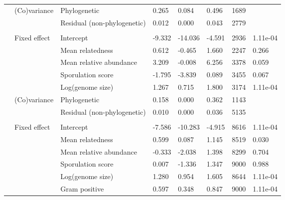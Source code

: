 \begin{table}
\begin{tabular}[t]{llllllll}
\hspace{1em} & (Co)variance & Phylogenetic & 0.265 & 0.084 & 0.496 & 1689 & \\
\hspace{1em} &  & Residual (non-phylogenetic) & 0.012 & 0.000 & 0.043 & 2779 & \\
\addlinespace[0.3em]
\multicolumn{8}{l}{\textbf{Antibiotic degradation}}\\
\hspace{1em} & Fixed effect & Intercept & -9.332 & -14.036 & -4.591 & 2936 & 1.11e-04\\
\hspace{1em} &  & Mean relatedness & 0.612 & -0.465 & 1.660 & 2247 & 0.266\\
\hspace{1em} &  & Mean relative abundance & 3.209 & -0.008 & 6.256 & 3378 & 0.059\\
\hspace{1em} &  & Sporulation score & -1.795 & -3.839 & 0.089 & 3455 & 0.067\\
\hspace{1em} &  & Log(genome size) & 1.267 & 0.715 & 1.800 & 3174 & 1.11e-04\\
\hspace{1em} & (Co)variance & Phylogenetic & 0.158 & 0.000 & 0.362 & 1143 & \\
\hspace{1em} &  & Residual (non-phylogenetic) & 0.010 & 0.000 & 0.036 & 5135 & \\
\addlinespace[0.3em]
\multicolumn{8}{l}{\textbf{Secretome}}\\
\hspace{1em} & Fixed effect & Intercept & -7.586 & -10.283 & -4.915 & 8616 & 1.11e-04\\
\hspace{1em} &  & Mean relatedness & 0.599 & 0.087 & 1.145 & 8519 & 0.030\\
\hspace{1em} &  & Mean relative abundance & -0.333 & -2.038 & 1.398 & 8299 & 0.704\\
\hspace{1em} &  & Sporulation score & 0.007 & -1.336 & 1.347 & 9000 & 0.988\\
\hspace{1em} &  & Log(genome size) & 1.280 & 0.954 & 1.605 & 8644 & 1.11e-04\\
\hspace{1em} &  & Gram positive & 0.597 & 0.348 & 0.847 & 9000 & 1.11e-04\\

\end{tabular}
\end{table}
